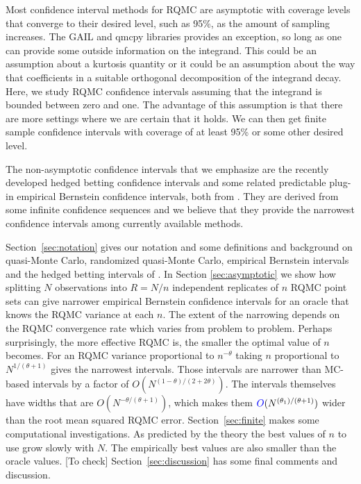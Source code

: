 \documentclass{article}
\newcommand{\art}[1]{\begingroup\color{blue}#1\endgroup}
\newcommand{\fred}[1]{\begingroup\color{red}#1\endgroup}
\begin{document}
Most confidence interval methods for RQMC are asymptotic
with coverage levels that converge to their desired level,
such as 95\%, as the amount of sampling increases.  The GAIL \fred{\cite{Gail_ug} and qmcpy \cite{QMCPy2020a} } libraries provides an exception, so long as one can
provide some outside information on the integrand.  This could
be an assumption about a kurtosis quantity or it could be
an assumption about the way that coefficients in
a suitable orthogonal decomposition of the integrand decay.
\art{Here, we study RQMC confidence intervals
assuming that the integrand is bounded between
zero and one.  The advantage of this assumption is that
there are more settings where we are certain that it holds.}
We can then get finite sample confidence
intervals with coverage of at least 95\% or some other desired level.

The non-asymptotic confidence intervals that we emphasize are the
recently developed \art{hedged betting confidence intervals}
and some related predictable plug-in empirical Bernstein
confidence intervals, both from \cite{WauRam24a}. They are derived
from some infinite confidence sequences and we believe that
they provide the narrowest confidence intervals among
currently available methods.

Section~\ref{sec:notation} gives our notation
and some definitions and background on quasi-Monte
Carlo, randomized quasi-Monte Carlo, empirical Bernstein
intervals and the \art{hedged betting}
intervals of \cite{WauRam24a}. In Section \ref{sec:asymptotic}
we show how splitting $N$ observations into $R=N/n$ independent
replicates of $n$ RQMC point sets can give narrower
empirical Bernstein confidence intervals \art{for an oracle
that knows the RQMC variance at each $n$}.  The extent of the
narrowing depends on the RQMC convergence rate which
varies from problem to problem. Perhaps surprisingly,
the more effective RQMC is, the smaller the optimal value
of $n$ becomes.  \art{For an RQMC variance  proportional to $n^{-\theta}$
taking $n$ proportional to $N^{1/(\theta+1)}$}
gives the narrowest intervals.  Those intervals are narrower
than MC-based intervals by a factor of $O(N^{(1-\theta)/(2+2\theta)})$.
The intervals themselves have widths that are
$O(N^{-\theta/(\theta+1)})$\fred{, which makes them $\art{O}(N^{(\theta_1)/(\theta+1)})$ \art{wider} than the root mean squared RQMC error}. Section~\ref{sec:finite} makes
some computational investigations.  As predicted by the theory
the best values of $n$ to use grow slowly with $N$.
\art{The empirically best values are also smaller
than the oracle values. [To check]}
Section~\ref{sec:discussion} has some final comments
and discussion.
\end{document}
